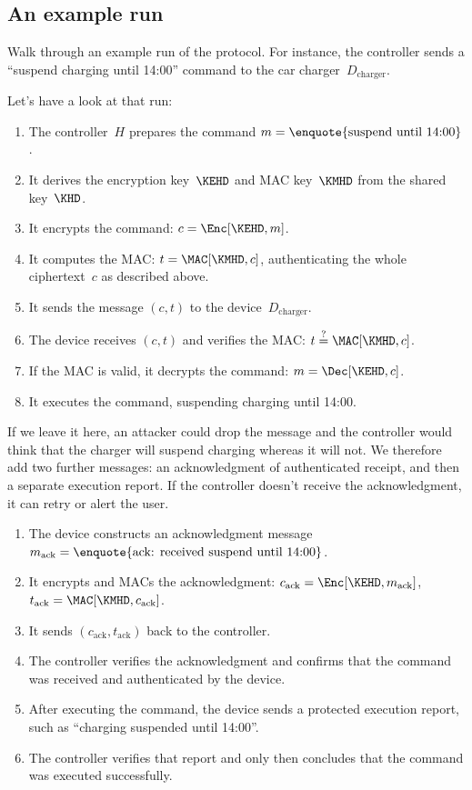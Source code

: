 \subsection{An example run}

\begin{exercise}
  Walk through an example run of the protocol.
  For instance, the controller sends a \enquote{suspend charging until 14:00}
  command to the car charger~\(D_{\text{charger}}\).
\end{exercise}

Let's have a look at that run:
\begin{enumerate}
  \item The controller~\(H\) prepares the command \(m = \text{\enquote{suspend 
    until 14:00}}\).
  \item It derives the encryption key~\(\KEHD\) and MAC key~\(\KMHD\) from
    the shared key~\(\KHD\).
  \item It encrypts the command: \(c = \Enc[\KEHD, m]\).
  \item It computes the MAC: \(t = \MAC[\KMHD, c]\), authenticating the
    whole ciphertext~\(c\) as described above.
  \item It sends the message \((c, t)\) to the device~\(D_{\text{charger}}\).
  \item The device receives \((c, t)\) and verifies the MAC:
    \(t \stackrel ?= \MAC[\KMHD, c]\).
  \item If the MAC is valid, it decrypts the command: \(m = \Dec[\KEHD, c]\).
  \item It executes the command, suspending charging until 14:00.
\end{enumerate}

If we leave it here, an attacker could drop the message and the controller 
would think that the charger will suspend charging whereas it will not.
We therefore add two further messages: an acknowledgment of authenticated
receipt, and then a separate execution report.
If the controller doesn't receive the acknowledgment, it can retry or alert the
user.
\begin{enumerate}[resume]
  \item The device constructs an acknowledgment message \(m_{\text{ack}} =
    \text{\enquote{ack: received suspend until 14:00}}\).
  \item It encrypts and MACs the acknowledgment:
    \(c_{\text{ack}} = \Enc[\KEHD, m_{\text{ack}}]\),
    \(t_{\text{ack}} = \MAC[\KMHD, c_{\text{ack}}]\).
  \item It sends \((c_{\text{ack}}, t_{\text{ack}})\) back to the
    controller.
  \item The controller verifies the acknowledgment and confirms that the
    command was received and authenticated by the device.
  \item After executing the command, the device sends a protected execution
    report, such as \enquote{charging suspended until 14:00}.
  \item The controller verifies that report and only then concludes that the
    command was executed successfully.
\end{enumerate}

